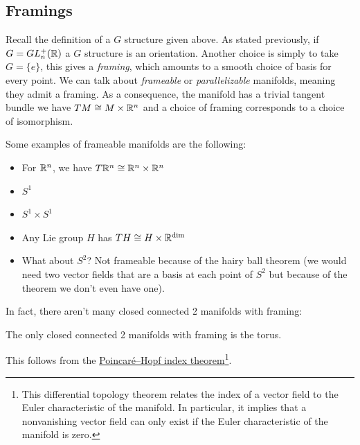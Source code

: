 
\subsection{Framings} %
\label{sub:framings}

Recall the definition of a $G$ structure given above. As stated previously, if $G = GL_n^+(\mathbb{R})$ a $G$ structure is an orientation. Another choice is simply to take $G = \{e\}$, this gives a \textit{framing}, which amounts to a smooth choice of basis for every point. We can talk about \textit{frameable} or \textit{parallelizable} manifolds, meaning they admit a framing. As a consequence, the manifold has a trivial tangent bundle we have $TM \cong M \times \mathbb{R}^n$ and a choice of framing corresponds to a choice of isomorphism.

\begin{ex}
Some examples of frameable manifolds are the following:
    \begin{itemize}
        \item For $\mathbb{R}^n$, we have $T\mathbb{R}^n \cong \mathbb{R}^n \times \mathbb{R}^n$
        \item $S^1$
        \item $S^1 \times S^1$
        \item Any Lie group $H$ has $TH \cong H \times \mathbb{R}^{\dim}$
        \item What about $S^2$? Not frameable because of the hairy ball theorem (we would need two vector fields that are a basis at each point of $S^2$ but because of the theorem we don't even have one).
    \end{itemize}
\end{ex}

\noindent In fact, there aren't many closed connected 2 manifolds with framing:
\begin{fct}
    The only closed connected 2 manifolds with framing is the torus.
\end{fct}
\noindent This follows from the \href{https://en.wikipedia.org/wiki/Poincar%C3%A9%E2%80%93Hopf_theorem}{Poincaré–Hopf index theorem}\footnote{This differential topology theorem relates the index of a vector field to the Euler characteristic of the manifold. In particular, it implies that a nonvanishing vector field can only exist if the Euler characteristic of the manifold is zero.}.

